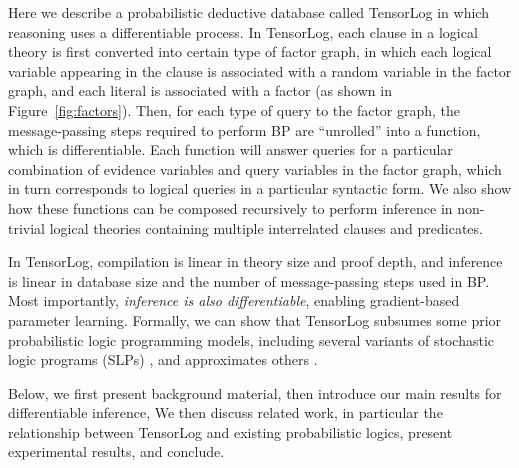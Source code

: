 \documentclass{article}
\newcommand{\vek}[1]{\textbf{#1}}
\newcommand{\M}{\textbf{M}}
\newcommand{\C}{{\cal{C}}}
\newcommand{\T}{{\cal{T}}}
\newcommand{\DB}{{\cal{DB}}}
\begin{document}
Here we describe a probabilistic deductive database called TensorLog
in which reasoning uses a differentiable process.  In TensorLog, each
clause in a logical theory is first converted into certain type of
factor graph, in which each logical variable appearing in the clause
is associated with a random variable in the factor graph, and each
literal is associated with a factor (as shown in
Figure~\ref{fig:factors}).  Then, for each type of query to the factor
graph, the message-passing steps required to perform BP are
``unrolled'' into a function, which is differentiable.  Each function
will answer queries for a particular combination of evidence variables
and query variables in the factor graph, which in turn corresponds to
logical queries in a particular syntactic form.  We also show how
these functions can be composed recursively to perform inference in
non-trivial logical theories containing multiple interrelated clauses
and predicates.

In TensorLog, compilation is linear in theory size and proof depth,
and inference is linear in database size and the number of
message-passing steps used in BP.  Most importantly, \emph{inference
  is also differentiable}, enabling gradient-based parameter
learning. Formally, we can show that TensorLog subsumes some prior
probabilistic logic programming models, including several variants of
stochastic logic programs (SLPs)
\cite{DBLP:journals/ml/Cussens01,wang2013programming}, and
approximates others
\cite{poole1997independent,fierens2016}.

Below, we first present background material, then introduce our main
results for differentiable inference, We then discuss related work, in
particular the relationship between TensorLog and existing
probabilistic logics, present experimental results, and conclude.

%
\end{document}
